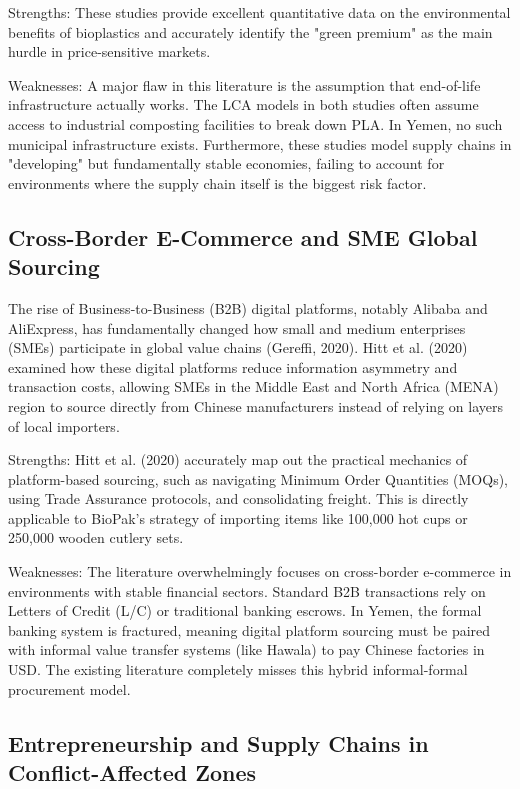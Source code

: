 \documentclass[12pt,a4paper]{article}
\begin{document}
Strengths: These studies provide excellent quantitative data on the environmental benefits of bioplastics and accurately identify the "green premium" as the main hurdle in price-sensitive markets.

Weaknesses: A major flaw in this literature is the assumption that end-of-life infrastructure actually works. The LCA models in both studies often assume access to industrial composting facilities to break down PLA. In Yemen, no such municipal infrastructure exists. Furthermore, these studies model supply chains in "developing" but fundamentally stable economies, failing to account for environments where the supply chain itself is the biggest risk factor.

\subsection{Cross-Border E-Commerce and SME Global Sourcing}

The rise of Business-to-Business (B2B) digital platforms, notably Alibaba and AliExpress, has fundamentally changed how small and medium enterprises (SMEs) participate in global value chains (Gereffi, 2020). Hitt et al. (2020) examined how these digital platforms reduce information asymmetry and transaction costs, allowing SMEs in the Middle East and North Africa (MENA) region to source directly from Chinese manufacturers instead of relying on layers of local importers.

Strengths: Hitt et al. (2020) accurately map out the practical mechanics of platform-based sourcing, such as navigating Minimum Order Quantities (MOQs), using Trade Assurance protocols, and consolidating freight. This is directly applicable to BioPak's strategy of importing items like 100,000 hot cups or 250,000 wooden cutlery sets.

Weaknesses: The literature overwhelmingly focuses on cross-border e-commerce in environments with stable financial sectors. Standard B2B transactions rely on Letters of Credit (L/C) or traditional banking escrows. In Yemen, the formal banking system is fractured, meaning digital platform sourcing must be paired with informal value transfer systems (like Hawala) to pay Chinese factories in USD. The existing literature completely misses this hybrid informal-formal procurement model.

\subsection{Entrepreneurship and Supply Chains in Conflict-Affected Zones}
\end{document}
